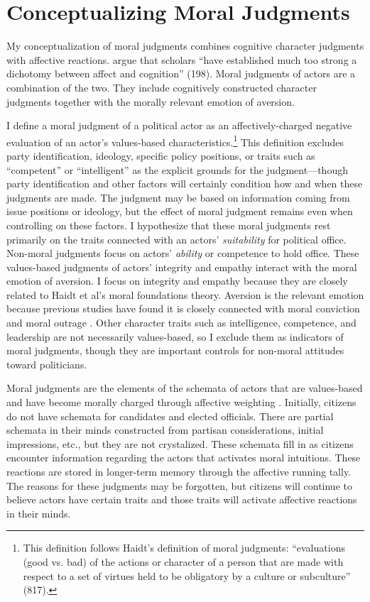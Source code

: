 \section{Conceptualizing Moral Judgments}
My conceptualization of moral judgments combines cognitive character judgments with affective reactions.  argue that scholars ``have established much too strong a dichotomy between affect and cognition'' (198). Moral judgments of actors are a combination of the two. They include cognitively constructed character judgments together with the morally relevant emotion of aversion.

I define a moral judgment of a political actor as an affectively-charged negative evaluation of an actor's values-based characteristics.\footnote{This definition follows Haidt's \citeyear{Haidt2001} definition of moral judgments: ``evaluations (good vs. bad) of the actions or character of a person that are made with respect to a set of virtues held to be obligatory by a culture or subculture'' (817).} This definition excludes party identification, ideology, specific policy positions, or traits such as ``competent'' or ``intelligent'' as the explicit grounds for the judgment---though party identification and other factors will certainly condition how and when these judgments are made. The judgment may be based on information coming from issue positions or ideology, but the effect of moral judgment remains even when controlling on these factors. I hypothesize that these moral judgments rest primarily on the traits connected with an actors' \emph{suitability} for political office. Non-moral judgments focus on actors' \emph{ability} or competence to hold office. These values-based judgments of actors' integrity and empathy interact with the moral emotion of aversion. I focus on integrity and empathy because they are closely related to Haidt et al's \cite{Haidt2012,Grahametal2012} moral foundations theory. Aversion is the relevant emotion because previous studies have found it is closely connected with moral conviction \cite{Petersen2010,SkitkaWisneski2011}and moral outrage \cite{SteenbergenEllis2006}. Other character traits such as intelligence, competence, and leadership are not necessarily values-based, so I exclude them as indicators of moral judgments, though they are important controls for non-moral attitudes toward politicians.

Moral judgments are the elements of the schemata of actors that are values-based and have become morally charged through affective weighting \cite{TaberLodgeGlathar2001}. Initially, citizens do not have schemata for candidates and elected officials. There are partial schemata in their minds constructed from partisan considerations, initial impressions, etc., but they are not crystalized. These schemata fill in as citizens encounter information regarding the actors that activates moral intuitions. These reactions are stored in longer-term memory through the affective running tally. The reasons for these judgments may be forgotten, but citizens will continue to believe actors have certain traits and those traits will activate affective reactions in their minds.

